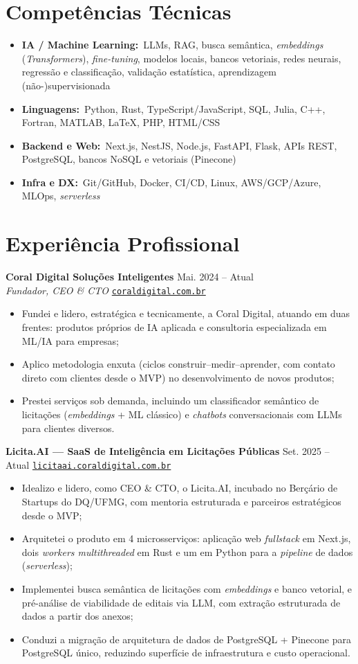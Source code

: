 \documentclass[10pt,a4paper]{article}
\newcommand{\entry}[4]{%
  \textbf{\sffamily\large #1} \hfill #2 \\
  {\itshape #3} \hfill {\small #4} \\[-0.75em]
}
\newcommand{\subentry}[2]{%
  \hspace{0.4em}\textbf{\sffamily #1} \hfill {\small #2}\\[-0.55em]
}
\newcommand*{\itemdesc}[2]{\item \textbf{\sffamily #1:}~{\small #2}}
\newcommand*{\link}[2]{\href{#1}{{\texttt{#2}}}}
\begin{document}
\section*{Competências Técnicas}
\begin{itemize}
\itemdesc{IA / Machine Learning}{LLMs, RAG, busca semântica, \textit{embeddings} (\textit{Transformers}), \textit{fine-tuning}, modelos locais, bancos vetoriais, redes neurais, regressão e classificação, validação estatística, aprendizagem (não-)supervisionada}
\itemdesc{Linguagens}{Python, Rust, TypeScript/JavaScript, SQL, Julia, C++, Fortran, MATLAB, \LaTeX, PHP, HTML/CSS}
\itemdesc{Backend e Web}{Next.js, NestJS, Node.js, FastAPI, Flask, APIs REST, PostgreSQL, bancos NoSQL e vetoriais (Pinecone)}
\itemdesc{Infra e DX}{Git/GitHub, Docker, CI/CD, Linux, AWS/GCP/Azure, MLOps, \textit{serverless}}
\end{itemize}

\section*{Experiência Profissional}

\entry{Coral Digital Soluções Inteligentes}{Mai. 2024 -- Atual}{Fundador, CEO \& CTO}{\link{https://coraldigital.com.br}{coraldigital.com.br}}
\begin{itemize}\footnotesize
  \item Fundei e lidero, estratégica e tecnicamente, a Coral Digital, atuando em duas frentes: produtos próprios de IA aplicada e consultoria especializada em ML/IA para empresas;
  \item Aplico metodologia enxuta (ciclos construir--medir--aprender, com contato direto com clientes desde o MVP) no desenvolvimento de novos produtos;
  \item Prestei serviços sob demanda, incluindo um classificador semântico de licitações (\textit{embeddings} + ML clássico) e \textit{chatbots} conversacionais com LLMs para clientes diversos.
\end{itemize}

\subentry{Licita.AI --- SaaS de Inteligência em Licitações Públicas}{Set. 2025 -- Atual \textbar{} \link{https://licitaai.coraldigital.com.br}{licitaai.coraldigital.com.br}}
\begin{itemize}[leftmargin=2.2em]\footnotesize
  \item Idealizo e lidero, como CEO \& CTO, o Licita.AI, incubado no Berçário de Startups do DQ/UFMG, com mentoria estruturada e parceiros estratégicos desde o MVP;
  \item Arquitetei o produto em 4 microsserviços: aplicação web \textit{fullstack} em Next.js, dois \textit{workers multithreaded} em Rust e um em Python para a \textit{pipeline} de dados (\textit{serverless});
  \item Implementei busca semântica de licitações com \textit{embeddings} e banco vetorial, e pré-análise de viabilidade de editais via LLM, com extração estruturada de dados a partir dos anexos;
  \item Conduzi a migração de arquitetura de dados de PostgreSQL + Pinecone para PostgreSQL único, reduzindo superfície de infraestrutura e custo operacional.
\end{itemize}
\end{document}
